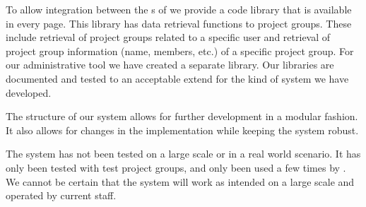 To allow integration between the \subsystem{}s of \system{} we provide a code library that is available in every \moodle{} page.
This library has data retrieval functions to project groups.
These include retrieval of project groups related to a specific user and retrieval of project group information (name, members, etc.) of a specific project group.
For our administrative tool we have created a separate library.
Our libraries are documented and tested to an acceptable extend for the kind of system we have developed.

The structure of our system allows for further development in a modular fashion.
It also allows for changes in the implementation while keeping the system robust.

The system has not been tested on a large scale or in a real world scenario.
It has only been tested with test project groups, and only been used a few times by \admpers{}.
We cannot be certain that the system will work as intended on a large scale and operated by current staff.














